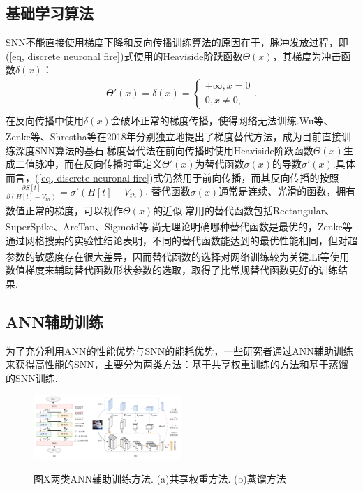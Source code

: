 \documentclass[10.5pt,compsoc,UTF8]{CjC}
\theoremstyle{mystyle}
\newcommand{\upcite}[1]{\textsuperscript{\cite{#1}}}
\begin{document}
\begin{multicols}{1}
\subsection{基础学习算法}%
SNN不能直接使用梯度下降和反向传播训练算法的原因在于，脉冲发放过程，即(\ref{eq, discrete neuronal fire})式使用的Heaviside阶跃函数$\Theta(x)$，其梯度为冲击函数$\delta(x)$：
\begin{align}
	\Theta'(x) = \delta(x) = \begin{cases}
		+\infty, x = 0\\
		0, x \ne 0,
	\end{cases}.
\end{align}
在反向传播中使用$\delta(x)$会破坏正常的梯度传播，使得网络无法训练.Wu等\upcite{wu2018STBP}、Zenke等\upcite{10.1162/neco_a_01086}、Shrestha等\upcite{shrestha2018slayer}在2018年分别独立地提出了梯度替代方法，成为目前直接训练深度SNN算法的基石.梯度替代法在前向传播时使用Heaviside阶跃函数$\Theta(x)$生成二值脉冲，而在反向传播时重定义$\Theta'(x)$为替代函数$\sigma(x)$的导数$\sigma'(x)$.具体而言，(\ref{eq, discrete neuronal fire})式仍然用于前向传播，而其反向传播的按照$\frac{\partial S[t]}{\partial (H[t] - V_{th})} = \sigma'(H[t] - V_{th})$.
替代函数$\sigma(x)$通常是连续、光滑的函数，拥有数值正常的梯度，可以视作$\Theta(x)$的近似.常用的替代函数包括Rectangular\upcite{wu2018STBP}、SuperSpike\upcite{10.1162/neco_a_01086}、ArcTan\upcite{fang2021incorporating}、Sigmoid等.尚无理论明确哪种替代函数是最优的，Zenke等\upcite{Zenke2020.06.29.176925}通过网格搜索的实验性结论表明，不同的替代函数能达到的最优性能相同，但对超参数的敏感度存在很大差异，因而替代函数的选择对网络训练较为关键.Li等\upcite{li2021differentiable}使用数值梯度来辅助替代函数形状参数的选取，取得了比常规替代函数更好的训练结果.

\subsection{ANN辅助训练}
为了充分利用ANN的性能优势与SNN的能耗优势，一些研究者通过ANN辅助训练来获得高性能的SNN，主要分为两类方法：基于共享权重训练的方法和基于蒸馏的SNN训练.


\begin{figure}[H]
	\centerline{\includegraphics[width=0.5\textwidth,trim=0 0 0 0,clip]{./data/assist.drawio.pdf}}
	{图X\quad 两类ANN辅助训练方法. (a)共享权重方法. (b)蒸馏方法}
	\label{fig:assist}
\end{figure}


\end{multicols}
\end{document}
